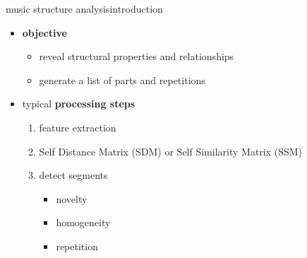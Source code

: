         \begin{frame}{music structure analysis}{introduction}
            \begin{itemize}
                \item   \textbf{objective}
                    \begin{itemize}
                        \item   reveal structural properties and relationships
                        \item   generate a list of parts and repetitions
                    \end{itemize}
                \bigskip
                \item   typical \textbf{processing steps}
                    \begin{enumerate}
                        \item   feature extraction
                        \item   Self Distance Matrix (SDM) or Self Similarity Matrix (SSM)
                        \item   detect segments
                            \begin{itemize}
                                \item novelty
                                \item homogeneity
                                \item repetition
                            \end{itemize}
                    \end{enumerate}
            \end{itemize}
        \end{frame}
